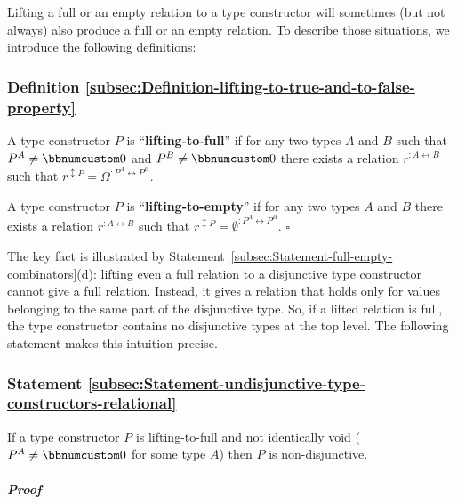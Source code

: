 Lifting a full or an empty relation to a type constructor will sometimes
(but not always) also produce a full or an empty relation. To describe
those situations, we introduce the following definitions:

\subsubsection{Definition \label{subsec:Definition-lifting-to-true-and-to-false-property}\ref{subsec:Definition-lifting-to-true-and-to-false-property}}

A type constructor $P$ is \textsf{``}\textbf{lifting-to-full}\textsf{''}
if for any two types $A$ and $B$ such that $P^{A}\neq\bbnum 0$
and $P^{B}\neq\bbnum 0$ there exists a relation $r^{:A\leftrightarrow B}$
such that $r^{\updownarrow P}=\Omega^{:P^{A}\leftrightarrow P^{B}}$.

A type constructor $P$ is \textsf{``}\textbf{lifting-to-empty}\textsf{''}
if for any two types $A$ and $B$ there exists a relation $r^{:A\leftrightarrow B}$
such that $r^{\updownarrow P}=\emptyset^{:P^{A}\leftrightarrow P^{B}}$.
$\square$

The key fact is illustrated by Statement~\ref{subsec:Statement-full-empty-combinators}(d):
lifting even a full relation to a disjunctive type constructor cannot
give a full relation. Instead, it gives a relation that holds only
for values belonging to the same part of the disjunctive type. So,
if a lifted relation is full, the type constructor contains no disjunctive
types at the top level. The following statement makes this intuition
precise.

\subsubsection{Statement \label{subsec:Statement-undisjunctive-type-constructors-relational}\ref{subsec:Statement-undisjunctive-type-constructors-relational}}

If a type constructor $P$ is lifting-to-full and not identically
void ($P^{A}\neq\bbnum 0$ for some type $A$) then $P$ is non-disjunctive.

\subparagraph{Proof}

